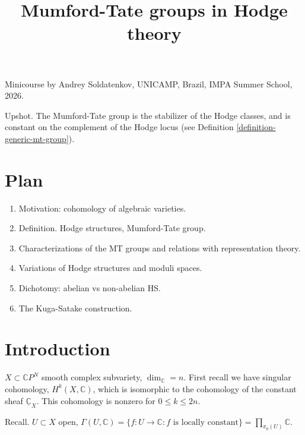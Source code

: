 


\title{Mumford-Tate groups in Hodge theory}
\maketitle

\noindent
Minicourse by Andrey Soldatenkov, UNICAMP,
Brazil,
IMPA Summer School, 2026.



\tableofcontents

\noindent
Upshot. The Mumford-Tate group is
the stabilizer of the Hodge classes,
and is constant on the complement of the
Hodge locus
(see Definition
\ref{definition-generic-mt-group}).

\section{Plan}
\label{section-plan}

\begin{enumerate}
\item Motivation: cohomology of algebraic
varieties.
\item Definition. Hodge structures,
Mumford-Tate group.
\item Characterizations of the MT groups and
relations with representation
theory.
\item Variations of Hodge structures and
moduli spaces.
\item Dichotomy: abelian vs non-abelian HS.
\item The Kuga-Satake construction.
\end{enumerate}

\section{Introduction}
\label{section-intro}

$X\subset \mathbb{C}P^N$ smooth complex
subvariety,
$\dim_\mathbb{C}=n$.
First recall we have singular cohomology,
$H^k(X,\mathbb{C})$,
which is isomorphic to the cohomology
of the constant sheaf
$\underline{\mathbb{C}}_X$.
This cohomology is nonzero for $0\leq k \leq
2n$.

Recall. $U \subset X$ open,
$\Gamma(U,\mathbb{C})=\{f:U \to \mathbb{C}:
\text{$f$ is locally constant}\}
=\prod_{\pi_0(U)}\mathbb{C}$.

